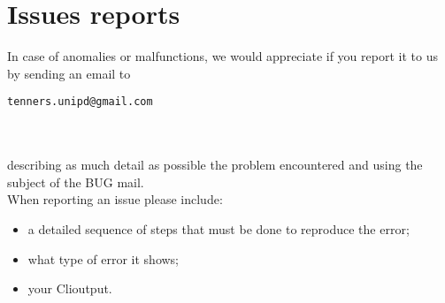 \section{Issues reports}
In case of anomalies or malfunctions, we would appreciate if you report it to us by sending an email to\\
\centerline {\texttt{tenners.unipd@gmail.com}}\\\\
describing as much detail as possible the problem encountered and using the subject of the BUG mail.\\
When reporting an issue please include:
\begin{itemize}
	\item a detailed sequence of steps that must be done to reproduce the error; 
	\item what type of error it shows;
	\item your Cli\glo output.
\end{itemize}
